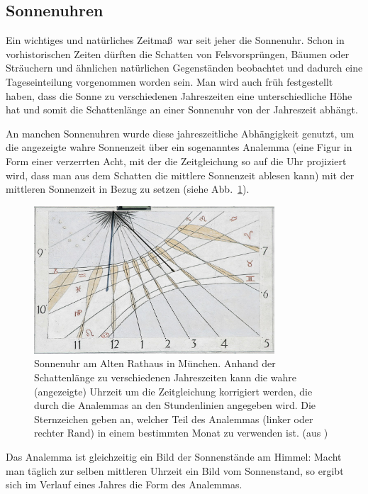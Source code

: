 \subsection{Sonnenuhren}

Ein wichtiges und nat\"urliches Zeitma\ss\ war seit jeher die Sonnenuhr. 
Schon in vorhistorischen Zeiten d\"urften die Schatten von Felsvorspr\"ungen, B\"aumen oder Str\"auchern
und \"ahnlichen nat\"urlichen Gegenst\"anden beobachtet und dadurch eine
Tageseinteilung vorgenommen worden sein. Man wird auch fr\"uh festgestellt haben, dass
die Sonne zu verschiedenen Jahreszeiten eine unterschiedliche H\"ohe hat und somit
die Schattenl\"ange an einer Sonnenuhr von der Jahreszeit abh\"angt. 

An manchen Sonnenuhren wurde diese jahreszeitliche Abh\"angigkeit genutzt, um die angezeigte
wahre Sonnenzeit \"uber ein sogenanntes Analemma (eine Figur in Form einer verzerrten Acht, mit
der die Zeitgleichung so auf die Uhr projiziert wird, dass man aus dem Schatten die mittlere
Sonnenzeit ablesen kann) 
mit der mittleren Sonnenzeit in Bezug zu setzen (siehe Abb.\ \ref{fig_Munich_Analemma}).

\begin{figure}[htb]
\includegraphics[width=0.8\textwidth]{./Bilder/Munich_Altes_Rathaus_sundial.jpg}
\caption{\label{fig_Munich_Analemma}%
Sonnenuhr am Alten Rathaus in M\"unchen. Anhand der Schattenl\"ange zu verschiedenen Jahreszeiten
kann die wahre (angezeigte) Uhrzeit um die Zeitgleichung korrigiert werden, die durch die
Analemmas an den Stundenlinien angegeben wird. Die Sternzeichen geben an, welcher
Teil des Analemmas (linker oder rechter Rand) in einem bestimmten Monat zu verwenden ist. (aus \cite{Niermann})} 
\end{figure}

Das Analemma ist gleichzeitig ein Bild der Sonnenst\"ande am Himmel: Macht man t\"aglich
zur selben mittleren Uhrzeit ein Bild vom Sonnenstand, so ergibt sich im Verlauf eines Jahres die Form
des Analemmas.  

